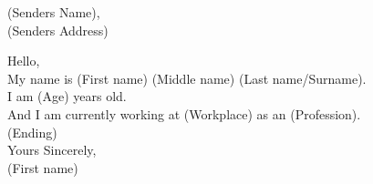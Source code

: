 \documentclass{article}
\begin{document}

\begin{flushright}
(Senders Name),\\
(Senders Address)
\end{flushright}

\begin{flushleft}
Hello,\\
My name is (First name) (Middle name) (Last name/Surname).\\
I am (Age) years old.\\
And I am currently working at (Workplace) as an (Profession).\\
(Ending)\\
\vspace{1cm}
Yours Sincerely,\\

(First name)
\end{flushleft}
 

\newpage
\layout
\end{document}
